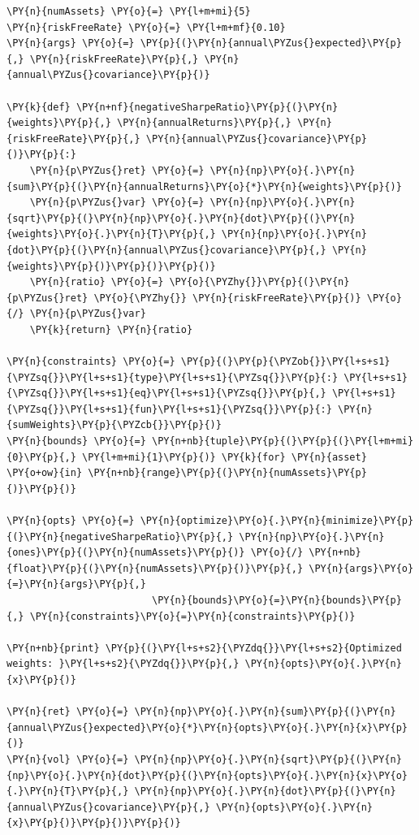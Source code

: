     \begin{tcolorbox}[breakable, size=fbox, boxrule=1pt, pad at break*=1mm,colback=cellbackground, colframe=cellborder]
\begin{Verbatim}[commandchars=\\\{\}]
\PY{n}{numAssets} \PY{o}{=} \PY{l+m+mi}{5}
\PY{n}{riskFreeRate} \PY{o}{=} \PY{l+m+mf}{0.10}
\PY{n}{args} \PY{o}{=} \PY{p}{(}\PY{n}{annual\PYZus{}expected}\PY{p}{,} \PY{n}{riskFreeRate}\PY{p}{,} \PY{n}{annual\PYZus{}covariance}\PY{p}{)}

\PY{k}{def} \PY{n+nf}{negativeSharpeRatio}\PY{p}{(}\PY{n}{weights}\PY{p}{,} \PY{n}{annualReturns}\PY{p}{,} \PY{n}{riskFreeRate}\PY{p}{,} \PY{n}{annual\PYZus{}covariance}\PY{p}{)}\PY{p}{:}
    \PY{n}{p\PYZus{}ret} \PY{o}{=} \PY{n}{np}\PY{o}{.}\PY{n}{sum}\PY{p}{(}\PY{n}{annualReturns}\PY{o}{*}\PY{n}{weights}\PY{p}{)}
    \PY{n}{p\PYZus{}var} \PY{o}{=} \PY{n}{np}\PY{o}{.}\PY{n}{sqrt}\PY{p}{(}\PY{n}{np}\PY{o}{.}\PY{n}{dot}\PY{p}{(}\PY{n}{weights}\PY{o}{.}\PY{n}{T}\PY{p}{,} \PY{n}{np}\PY{o}{.}\PY{n}{dot}\PY{p}{(}\PY{n}{annual\PYZus{}covariance}\PY{p}{,} \PY{n}{weights}\PY{p}{)}\PY{p}{)}\PY{p}{)}
    \PY{n}{ratio} \PY{o}{=} \PY{o}{\PYZhy{}}\PY{p}{(}\PY{n}{p\PYZus{}ret} \PY{o}{\PYZhy{}} \PY{n}{riskFreeRate}\PY{p}{)} \PY{o}{/} \PY{n}{p\PYZus{}var}
    \PY{k}{return} \PY{n}{ratio}
    
\PY{n}{constraints} \PY{o}{=} \PY{p}{(}\PY{p}{\PYZob{}}\PY{l+s+s1}{\PYZsq{}}\PY{l+s+s1}{type}\PY{l+s+s1}{\PYZsq{}}\PY{p}{:} \PY{l+s+s1}{\PYZsq{}}\PY{l+s+s1}{eq}\PY{l+s+s1}{\PYZsq{}}\PY{p}{,} \PY{l+s+s1}{\PYZsq{}}\PY{l+s+s1}{fun}\PY{l+s+s1}{\PYZsq{}}\PY{p}{:} \PY{n}{sumWeights}\PY{p}{\PYZcb{}}\PY{p}{)}
\PY{n}{bounds} \PY{o}{=} \PY{n+nb}{tuple}\PY{p}{(}\PY{p}{(}\PY{l+m+mi}{0}\PY{p}{,} \PY{l+m+mi}{1}\PY{p}{)} \PY{k}{for} \PY{n}{asset} \PY{o+ow}{in} \PY{n+nb}{range}\PY{p}{(}\PY{n}{numAssets}\PY{p}{)}\PY{p}{)}

\PY{n}{opts} \PY{o}{=} \PY{n}{optimize}\PY{o}{.}\PY{n}{minimize}\PY{p}{(}\PY{n}{negativeSharpeRatio}\PY{p}{,} \PY{n}{np}\PY{o}{.}\PY{n}{ones}\PY{p}{(}\PY{n}{numAssets}\PY{p}{)} \PY{o}{/} \PY{n+nb}{float}\PY{p}{(}\PY{n}{numAssets}\PY{p}{)}\PY{p}{,} \PY{n}{args}\PY{o}{=}\PY{n}{args}\PY{p}{,}
                         \PY{n}{bounds}\PY{o}{=}\PY{n}{bounds}\PY{p}{,} \PY{n}{constraints}\PY{o}{=}\PY{n}{constraints}\PY{p}{)}

\PY{n+nb}{print} \PY{p}{(}\PY{l+s+s2}{\PYZdq{}}\PY{l+s+s2}{Optimized weights: }\PY{l+s+s2}{\PYZdq{}}\PY{p}{,} \PY{n}{opts}\PY{o}{.}\PY{n}{x}\PY{p}{)}

\PY{n}{ret} \PY{o}{=} \PY{n}{np}\PY{o}{.}\PY{n}{sum}\PY{p}{(}\PY{n}{annual\PYZus{}expected}\PY{o}{*}\PY{n}{opts}\PY{o}{.}\PY{n}{x}\PY{p}{)}
\PY{n}{vol} \PY{o}{=} \PY{n}{np}\PY{o}{.}\PY{n}{sqrt}\PY{p}{(}\PY{n}{np}\PY{o}{.}\PY{n}{dot}\PY{p}{(}\PY{n}{opts}\PY{o}{.}\PY{n}{x}\PY{o}{.}\PY{n}{T}\PY{p}{,} \PY{n}{np}\PY{o}{.}\PY{n}{dot}\PY{p}{(}\PY{n}{annual\PYZus{}covariance}\PY{p}{,} \PY{n}{opts}\PY{o}{.}\PY{n}{x}\PY{p}{)}\PY{p}{)}\PY{p}{)}


\end{Verbatim}
\end{tcolorbox}
